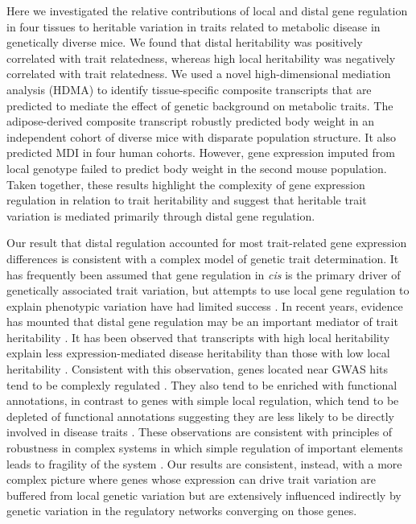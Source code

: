 \documentclass[
]{article}
\begin{document}
Here we investigated the relative contributions of local and distal gene
regulation in four tissues to heritable variation in traits related to
metabolic disease in genetically diverse mice. We found that distal
heritability was positively correlated with trait relatedness, whereas
high local heritability was negatively correlated with trait
relatedness. We used a novel high-dimensional mediation analysis (HDMA)
to identify tissue-specific composite transcripts that are predicted to
mediate the effect of genetic background on metabolic traits. The
adipose-derived composite transcript robustly predicted body weight in
an independent cohort of diverse mice with disparate population
structure. It also predicted MDI in four human cohorts. However, gene
expression imputed from local genotype failed to predict body weight in
the second mouse population. Taken together, these results highlight the
complexity of gene expression regulation in relation to trait
heritability and suggest that heritable trait variation is mediated
primarily through distal gene regulation.

Our result that distal regulation accounted for most trait-related gene
expression differences is consistent with a complex model of genetic
trait determination. It has frequently been assumed that gene regulation
in \textit{cis} is the primary driver of genetically associated trait
variation, but attempts to use local gene regulation to explain
phenotypic variation have had limited success
\cite{pmid32912663, pmid36515579}. In recent years, evidence has mounted
that distal gene regulation may be an important mediator of trait
heritability \cite{pmid32424349, 
pmid37857933, pmid31051098, pmid34475573}. It has been observed that
transcripts with high local heritability explain less
expression-mediated disease heritability than those with low local
heritability \cite{pmid32424349}. Consistent with this observation,
genes located near GWAS hits tend to be complexly regulated
\cite{pmid37857933}. They also tend to be enriched with functional
annotations, in contrast to genes with simple local regulation, which
tend to be depleted of functional annotations suggesting they are less
likely to be directly involved in disease traits \cite{pmid37857933}.
These observations are consistent with principles of robustness in
complex systems in which simple regulation of important elements leads
to fragility of the system
\cite{pmid29782925, pmid12082173, pmid27304973}. Our results are
consistent, instead, with a more complex picture where genes whose
expression can drive trait variation are buffered from local genetic
variation but are extensively influenced indirectly by genetic variation
in the regulatory networks converging on those genes.
\end{document}
